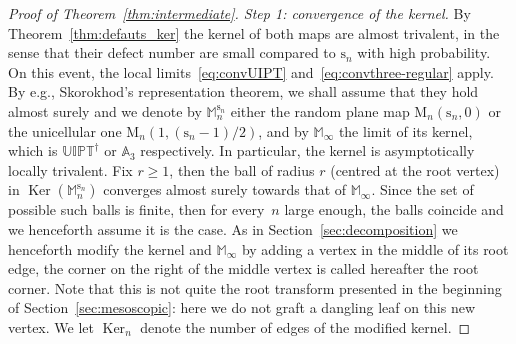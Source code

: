 \documentclass[11pt]{article}
\newcommand{\eg}{e.g.,\xspace}
\theoremstyle{plain}
\theoremstyle{definition}
\theoremstyle{remark}
\newcommand{\Map}{\mathrm{M}}
\newcommand{\Mapb}{\mathbb{M}}
\newcommand{\spar}{\mathrm{s}}
\DeclareMathOperator{\Ker}{Ker}
\begin{document}
\begin{proof}[Proof of Theorem~\ref{thm:intermediate}. Step 1: convergence of the kernel]
By Theorem~\ref{thm:defauts_ker} the kernel of both maps are almost trivalent, in the sense that their defect number are small compared to $\spar_n$ with high probability. On this event, the local limits~\eqref{eq:convUIPT} and~\eqref{eq:convthree-regular} apply. By \eg Skorokhod's representation theorem, we shall assume that they hold almost surely and we denote by $\Mapb_n^{\spar_n}$ either the random plane map $\Map_{n}(\spar_{n},0)$ or the unicellular one $\Map_{n}(1, (\spar_{n}-1)/2)$, and by $\Mapb_\infty$ the limit of its kernel, which is $\mathbb{UIPT}^\dagger$ or $\mathbb{A}_3$ respectively. In particular, the kernel is asymptotically locally trivalent.
Fix $r \ge1$, then the ball of radius $r$ (centred at the root vertex) in $\Ker(\Mapb_n^{\spar_n})$ converges almost surely towards that of $\Mapb_\infty$. Since the set of possible such balls is finite, then for \hbox{every}~$n$ large enough, the balls coincide and we henceforth assume it is the case. As in Section~\ref{sec:decomposition} we henceforth modify the kernel and $\Mapb_\infty$ by adding a vertex in the middle of its root edge, the corner on the right of the middle vertex is called hereafter the root corner. Note that this is not quite the root transform presented in the beginning of Section~\ref{sec:mesoscopic}: here we do not graft a dangling leaf on this new vertex.
We let $\Ker_n$ denote the number of edges of the modified kernel.


\end{proof}
\end{document}
